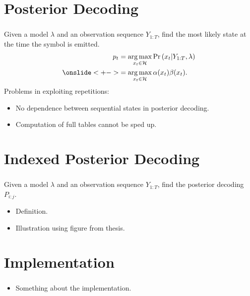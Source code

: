 \documentclass[english,notes]{beamer}
\DeclareMathOperator*{\argmax}{arg\,max}
\begin{document}
\section{Posterior Decoding}

\begin{frame}
  \frametitle{\insertsection}
  \onslide<+->
  Given a model $\lambda$ and an observation sequence $Y_{1:T}$,
  find the most likely state at the time the symbol is emitted.
  \begin{equation*}
    \begin{aligned}
      p_t & = \argmax_{x_t \in \mathcal{H}} \Pr \left(x_t | Y_{1:T}, \lambda \right) \\
          \onslide<+-> & = \argmax_{x_t \in \mathcal{H}} \alpha(x_t) \beta(x_t).
    \end{aligned}
  \end{equation*}
  \onslide<+->
  Problems in exploiting repetitions:
  \begin{itemize}
  \item<+-> No dependence between sequential states in posterior decoding.
  \item<+-> Computation of full tables cannot be sped up.
  \end{itemize}
\end{frame}

\section{Indexed Posterior Decoding}

\begin{frame}
  \frametitle{\insertsection}
  \onslide<+->
  Given a model $\lambda$ and an observation sequence $Y_{1:T}$, find the
  posterior decoding $P_{i:j}$.

  \begin{itemize}
    \tiny
  \item Definition.
  \item Illustration using figure from thesis.
  \end{itemize}
\end{frame}

\section{Implementation}

\begin{frame}
  \frametitle{\insertsection}
  \begin{itemize}
    \tiny
  \item Something about the implementation.
  \end{itemize}
\end{frame}
\end{document}
